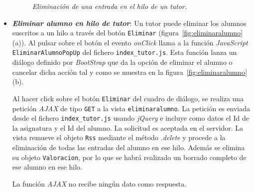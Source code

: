 \documentclass[a4paper, 12pt]{book}
\begin{document}
\begin{itemize}
  \begin{figure}
    \centering
    \caption{\textit{Eliminaci\'on de una entrada en el hilo de un tutor.}}
    \label{fig:eliminarentrada}
  \end{figure}

  
  \item {\bfseries \textit{Eliminar alumno en hilo de tutor}}: Un tutor puede eliminar los alumnos suscritos a un hilo a trav\'es del 
  bot\'on \texttt{Eliminar} (figura~\ref{fig:eliminaralumno}(a)). Al pulsar sobre el bot\'on el evento \textit{onClick} llama a la funci\'on 
  \textit{JavaScript} \texttt{EliminarAlumnoPopUp} del fichero \texttt{index\_tutor.js}. Esta funci\'on lanza un di\'alogo definido por \textit{BootStrap} 
  que da la opci\'on de eliminar el alumno o cancelar dicha acci\'on tal y como se muestra en la figura~\ref{fig:eliminaralumno}(b). 
  
  Al hacer click sobre el bot\'on \texttt{Eliminar} del cuadro de di\'alogo, se realiza una petici\'on \textit{AJAX} de tipo \texttt{GET} a la vista 
  \texttt{eliminaralumno}. La petici\'on es enviada desde el fichero \texttt{index\_tutor.js} usando \textit{jQuery} e incluye como datos el 
  Id de la asignatura y el Id del alumno. La solicitud es aceptada en el servidor. La vista remueve el objeto \texttt{Rss} mediante el m\'etodo 
  \textit{.delete} y procede a la eliminaci\'on de todas las entradas del alumno en ese hilo. Adem\'as se elimina su objeto \texttt{Valoracion},
  por lo que se habr\'a realizado un borrado completo de ese alumno en ese hilo.
  
  La funci\'on \textit{AJAX} no recibe ning\'un dato como respuesta.
  

\end{itemize}
\end{document}
